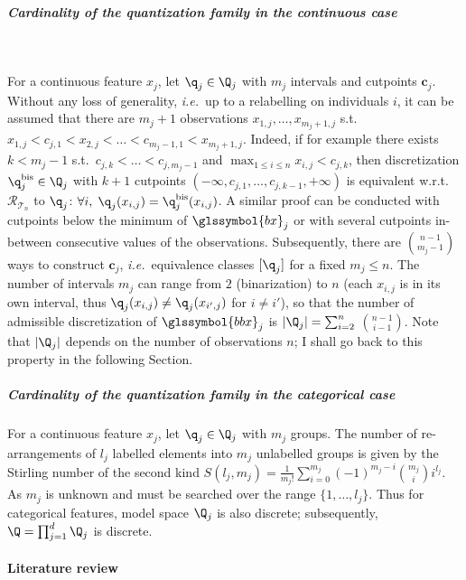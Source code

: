 \subparagraph{Cardinality of the quantization family in the continuous case} ~\label{par:cardinality}

For a continuous feature $x_j$, let $\q_j \in \Q_j$ with $m_j$ intervals and cutpoints $\boldsymbol{c}_j$. Without any loss of generality, \textit{i.e.}\ up to a relabelling on individuals $i$, it can be assumed that there are $m_j+1$ observations $x_{1,j},\dots,x_{m_j+1,j}$ s.t.\ $x_{1,j} < c_{j,1} < x_{2,j} < \dots < c_{m_j-1,1} < x_{m_j+1,j}$. Indeed, if for example there exists $k < m_j - 1$ s.t.\ $c_{j,k} < \dots < c_{j,m_j-1}$ and $\max_{1 \leq i \leq n} x_{i,j} < c_{j,k}$, then discretization $\q^{\text{bis}}_j \in \Q_j$ with $k+1$ cutpoints $(-\infty,c_{j,1},\dots,c_{j,k-1},+\infty)$ is equivalent w.r.t.\ $\mathcal{R}_{\mathcal{T}_n}$ to $\q_j$: $\forall i, \; \q_j(x_{i,j}) = \q^{\text{bis}}_j(x_{i,j})$. A similar proof can be conducted with cutpoints below the minimum of $\glssymbol{bx}_j$ or with several cutpoints in-between consecutive values of the observations. Subsequently, there are $\binom{n-1}{m_j-1}$ ways to construct $\bm{c}_j$, \textit{i.e.}\ equivalence classes $[\q_j]$ for a fixed $m_j \leq n$. The number of intervals $m_j$ can range from $2$ (binarization) to $n$ (each $x_{i,j}$ is in its own interval, thus $\q_j(x_{i,j}) \neq \q_j(x_{i',j})$ for $i \neq i'$), so that the number of admissible discretization of $\glssymbol{bbx}_j$ is $|\Q_j| = \sum_{i=2}^{n}$ ${n-1}\choose{i-1}$. Note that $|\Q_j|$ depends on the number of observations $n$; I shall go back to this property in the following Section.


\subparagraph{Cardinality of the quantization family in the categorical case}

For a continuous feature $x_j$, let $\q_j \in \Q_j$ with $m_j$ groups. The number of re-arrangements of $l_j$ labelled elements into $m_j$ unlabelled groups is given by the Stirling number of the second kind $S(l_j,m_j) = \frac{1}{m_j!} \sum_{i=0}^{m_j} (-1)^{m_j-i} {m_j \choose i} i^{l_j}$. As $m_j$ is unknown and must be searched over the range $\{1,\dots,l_j\}$. Thus for categorical features, model space $\Q_j$ is also discrete; subsequently, $\Q = \prod_{j=1}^d \Q_j$ is discrete.







\paragraph{Literature review}

